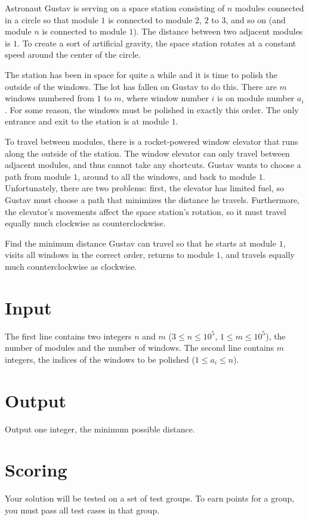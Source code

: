 Astronaut Gustav is serving on a space station consisting of $n$ modules connected in a circle so that module $1$ is connected to module $2$, $2$ to $3$, and so on (and module $n$ is connected to module $1$).
The distance between two adjacent modules is $1$. To create a sort of artificial gravity, the space station rotates at a constant speed around the center of the circle.

The station has been in space for quite a while and it is time to polish the outside of the windows.
The lot has fallen on Gustav to do this. There are $m$ windows numbered from $1$ to $m$, where window number $i$ is on module number $a_i$.
For some reason, the windows must be polished in exactly this order. The only entrance and exit to the station is at module $1$.

To travel between modules, there is a rocket-powered window elevator that runs along the outside of the station.
The window elevator can only travel between adjacent modules, and thus cannot take any shortcuts.
Gustav wants to choose a path from module $1$, around to all the windows, and back to module $1$.
Unfortunately, there are two problems: first, the elevator has limited fuel, so Gustav must choose a path that minimizes the distance he travels.
Furthermore, the elevator's movements affect the space station's rotation, so it must travel equally much clockwise as counterclockwise.

Find the minimum distance Gustav can travel so that he starts at module $1$, visits all windows in the correct order, returns to module $1$, and travels equally much counterclockwise as clockwise.

\section*{Input}
The first line contains two integers $n$ and $m$ ($3 \leq n \leq 10^5$, $1 \leq m \leq 10^5$), the number of modules and the number of windows.
The second line contains $m$ integers, the indices of the windows to be polished ($1 \leq a_i \leq n$).

\section*{Output}
Output one integer, the minimum possible distance.

\section*{Scoring}
Your solution will be tested on a set of test groups. To earn points for a group, you must pass all test cases in that group.

